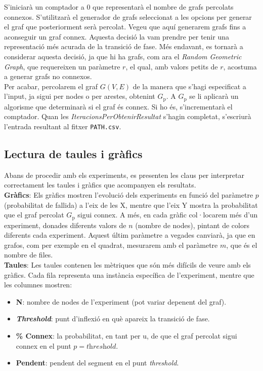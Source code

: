 \documentclass[a4paper]{article}
\begin{document}
	S'iniciarà un comptador a 0 que representarà el nombre de grafs percolats connexos. S'utilitzarà el generador de grafs seleccionat a les opcions per generar el graf que posteriorment serà percolat. Vegeu que aquí generarem grafs fins a aconseguir un graf connex. Aquesta decisió la vam prendre per tenir una representació més acurada de la transició de fase. Més endavant, es tornarà a considerar aquesta decisió, ja que hi ha grafs, com ara el \textit{Random Geometric Graph}, que requereixen un paràmetre $r$, el qual, amb valors petits de $r$, acostuma a generar grafs no connexos. \\
	
	Per acabar, percolarem el graf $G(V,E)$ de la manera que s'hagi especificat a l'input, ja sigui per nodes o per arestes, obtenint $G_{\text{p}}$. A $G_{\text{p}}$ se li aplicarà un algorisme que determinarà si el graf és connex. Si ho és, s'incrementarà el comptador. Quan les \textit{IteracionsPerObtenirResultat} s'hagin completat, s'escriurà l'entrada resultant al fitxer \texttt{PATH.csv}.
	
	\subsection{Lectura de taules i gràfics}
	
	Abans de procedir amb els experiments, es presenten les claus per interpretar correctament les taules i gràfics que acompanyen els resultats. \\
	
	\textbf{Gràfics}: Els gràfics mostren l'evolució dels experiments en funció del paràmetre $p$ (probabilitat de fallida) a l'eix de les X, mentre que l'eix Y mostra la probabilitat que el graf percolat $G_{\text{p}}$ sigui connex. A més, en cada gràfic col·locarem més d'un experiment, donades diferents valors de $n$ (nombre de nodes), pintant de colors diferents cada experiment. Aquest últim paràmetre a vegades canviarà, ja que en grafos, com per exemple en el quadrat, mesurarem amb el paràmetre $m$, que és el nombre de files. \\
	
	\textbf{Taules}: Les taules contenen les mètriques que són més difícils de veure amb els gràfics. Cada fila representa una instància específica de l'experiment, mentre que les columnes mostren:
	
	\begin{itemize}
		\item \textbf{N}: nombre de nodes de l'experiment (pot variar depenent del graf).
		\item \textbf{\textit{Threshold}}: punt d'inflexió en què apareix la transició de fase.
		\item \textbf{\% Connex}: la probabilitat, en tant per u, de que el graf percolat sigui connex en el punt $p = \textit{threshold}$.
		\item \textbf{Pendent}: pendent del segment en el punt \textit{threshold}.
	\end{itemize}
	
\end{document}
